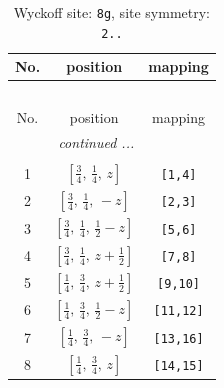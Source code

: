 \documentclass[fleqn,8pt]{jsarticle}
\begin{document}
\begin{longtable}{ccc}
\caption{Wyckoff site: {\tt 8g}, site symmetry: {\tt 2..}}
 \\
 \hline \hline
No. & position & mapping \\ \hline \endfirsthead

\multicolumn{2}{l}{\tablename\ \thetable{}} \\
 \hline \hline
No. & position & mapping \\ \hline \endhead

 \hline \hline
\multicolumn{2}{r}{\footnotesize\it continued ...} \\ \endfoot

 \hline \hline
\multicolumn{2}{r}{} \\ \endlastfoot

1 & $\left[ \frac{3}{4},\, \frac{1}{4},\, z \right]$ & {\tt [1,4]} \\ \hline
2 & $\left[ \frac{3}{4},\, \frac{1}{4},\, - z \right]$ & {\tt [2,3]} \\ \hline
3 & $\left[ \frac{3}{4},\, \frac{1}{4},\, \frac{1}{2} - z \right]$ & {\tt [5,6]} \\ \hline
4 & $\left[ \frac{3}{4},\, \frac{1}{4},\, z + \frac{1}{2} \right]$ & {\tt [7,8]} \\ \hline
5 & $\left[ \frac{1}{4},\, \frac{3}{4},\, z + \frac{1}{2} \right]$ & {\tt [9,10]} \\ \hline
6 & $\left[ \frac{1}{4},\, \frac{3}{4},\, \frac{1}{2} - z \right]$ & {\tt [11,12]} \\ \hline
7 & $\left[ \frac{1}{4},\, \frac{3}{4},\, - z \right]$ & {\tt [13,16]} \\ \hline
8 & $\left[ \frac{1}{4},\, \frac{3}{4},\, z \right]$ & {\tt [14,15]} \\
\end{longtable}
\renewcommand{\arraystretch}{1.2}
\end{document}
